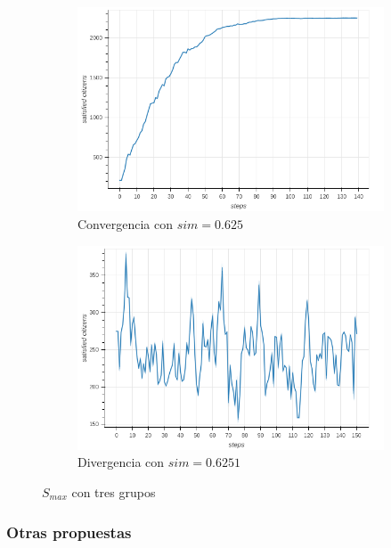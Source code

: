 \documentclass{article}
\begin{document}
\begin{itemize}
    \begin{figure}
      \centering
      \begin{subfigure}{0.4\textwidth}
        \includegraphics[width=\textwidth]{imgs/3_625.png}
        \caption{Convergencia con $sim=0.625$}
        \label{fig:sche-3-0625}
      \end{subfigure}
      \begin{subfigure}{0.4\textwidth}
        \includegraphics[width=\textwidth]{imgs/3_6251.png}
        \caption{Divergencia con $sim=0.6251$}
        \label{fig:sche-3-06251}
      \end{subfigure}
      \caption{$S_{max}$ con tres grupos}
      \label{fig:sche-3smax}
    \end{figure}
\end{itemize}


\subsubsection{Otras propuestas}
\end{document}
